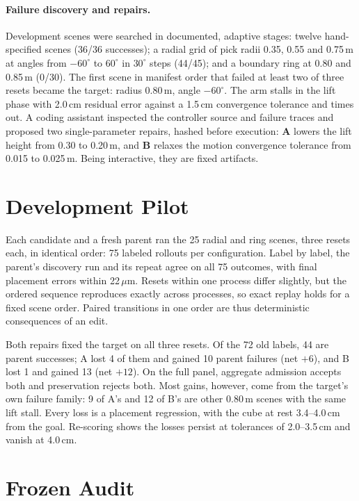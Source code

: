 \documentclass[letterpaper]{article} %
\begin{document}
\paragraph{Failure discovery and repairs.} Development scenes were searched in documented, adaptive stages: twelve hand-specified scenes (36/36 successes); a radial grid of pick radii 0.35, 0.55 and 0.75\,m at angles from $-60^\circ$ to $60^\circ$ in $30^\circ$ steps (44/45); and a boundary ring at 0.80 and 0.85\,m (0/30). The first scene in manifest order that failed at least two of three resets became the target: radius 0.80\,m, angle $-60^\circ$. The arm stalls in the lift phase with 2.0\,cm residual error against a 1.5\,cm convergence tolerance and times out. A coding assistant inspected the controller source and failure traces and proposed two single-parameter repairs, hashed before execution: \textbf{A} lowers the lift height from 0.30 to 0.20\,m, and \textbf{B} relaxes the motion convergence tolerance from 0.015 to 0.025\,m. Being interactive, they are fixed artifacts.

\section{Development Pilot}
Each candidate and a fresh parent ran the 25 radial and ring scenes, three resets each, in identical order: 75 labeled rollouts per configuration. Label by label, the parent's discovery run and its repeat agree on all 75 outcomes, with final placement errors within 22\,$\mu$m. Resets within one process differ slightly, but the ordered sequence reproduces exactly across processes, so exact replay holds for a fixed scene order. Paired transitions in one order are thus deterministic consequences of an edit.

Both repairs fixed the target on all three resets. Of the 72 old labels, 44 are parent successes; A lost 4 of them and gained 10 parent failures (net $+6$), and B lost 1 and gained 13 (net $+12$). On the full panel, aggregate admission accepts both and preservation rejects both. Most gains, however, come from the target's own failure family: 9 of A's and 12 of B's are other 0.80\,m scenes with the same lift stall. Every loss is a placement regression, with the cube at rest 3.4--4.0\,cm from the goal. Re-scoring shows the losses persist at tolerances of 2.0--3.5\,cm and vanish at 4.0\,cm.

\section{Frozen Audit}
\end{document}
